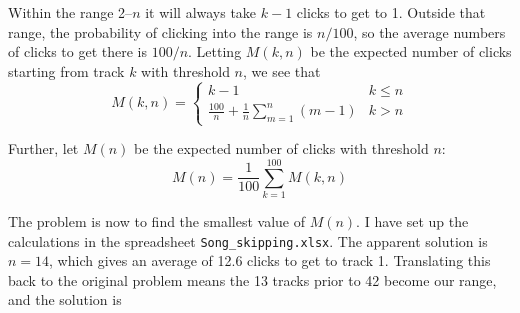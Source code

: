 \documentclass{article}
\begin{document}
Within the range 2--$n$ it will always take $k-1$ clicks to get to 1.
Outside that range, the probability of clicking into the range is $n/100$, so the average numbers of clicks to get there is $100/n$.
Letting $M(k,n)$ be the expected number of clicks starting from track $k$ with threshold $n$, we see that
\begin{equation*}
M(k,n)=
\begin{cases}
k-1 & k\leq n \\
\frac{100}{n}+\frac{1}{n}\sum\limits_{m=1}^{n}(m-1) & k>n
\end{cases}
\end{equation*}

Further, let $M(n)$ be the expected number of clicks with threshold $n$:
\begin{equation*}
M(n)=\frac{1}{100}\sum\limits_{k=1}^{100}M(k,n)
\end{equation*}

The problem is now to find the smallest value of $M(n)$.
I have set up the calculations in the spreadsheet \texttt{Song\_skipping.xlsx}.
The apparent solution is $n=14$, which gives an average of 12.6 clicks to get to track 1.
Translating this back to the original problem means the 13 tracks prior to 42 become our range, and the solution is
\end{document}
